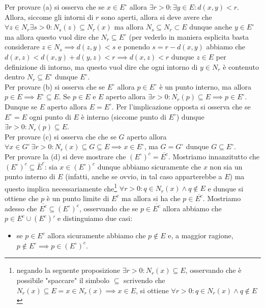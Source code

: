 \documentclass{report}
\begin{document}
\begin{mysolution}
Per provare (a) si osserva che se $x \in E^{\circ}$ allora $\exists r > 0: \exists y \in E: d(x, y) < r$. Allora, siccome gli intorni di $r$ sono aperti, allora si deve avere che $\forall z \in N_r \exists s > 0: N_s(z) \subseteq N_r(x)$ ma allora $N_s \subseteq N_r \subset E$ dunque anche $y \in E^{\circ}$ ma allora questo vuol dire che $N_r \subseteq E^{\circ}$ (per vederlo in maniera esplicita basta considerare $z \in N_s \implies d(z, y) < s$ e ponendo $s = r - d(x,y)$ abbiamo che $d(x, z) < d(x, y) + d(y, z) < r \implies d(x, z) < r$ dunque $z \in E$ per definizione di intorno, ma questo vuol dire che ogni intorno di $y \in N_r$ è contenuto dentro $N_r \subseteq E^{\circ}$ dunque $E^{\circ}$. \\
Per provare (b) si osserva che se $E^{\circ}$ allora $p \in E^{\circ}$ è un punto interno, ma allora $p \in E \implies E^{\circ} \subseteq E$. Se $p \in E$ e $E$ aperto allora $\exists r>0: N_r(p) \subseteq E \implies p \in E^{\circ}$. Dunque se $E$ aperto allora $E=E^{\circ}$. Per l'implicazione opposta si osserva che se $E^{\circ} = E$ ogni punto di $E$ è interno (siccome punto di $E^{\circ}$) dunque $\exists r>0: N_r(p) \subseteq E$. \\
Per provare (c) si osserva che che se $G$ aperto allora $\forall x \in G^{\circ} \, \exists r > 0: N_r(x) \subseteq G \subseteq E \implies x \in E^{\circ}$, ma $G=G^{\circ}$ dunque $G \subseteq E^{\circ}$. \\
Per provare la (d) si deve mostrare che $(E^{\circ})^c = \overline{E^c}$. Mostriamo innanzitutto che $(E^{\circ})^c \subseteq \bar{E}^c$: sia $x \in (E^{\circ})^c$ dunque abbiamo sicuramente che $x$ non sia un punto interno di $E$ (infatti, anche se ovvio, in tal caso apparterebbe a $E$) ma questo implica necessariamente che\footnote{negando la seguente proposizione $\exists r > 0: N_r(x) \subseteq E$, osservando che è possibile "spaccare" il simbolo $\subseteq$ scrivendo che $N_r(x) \subseteq E = x \in N_r(x) \implies x \in E$, si ottiene $\forall r > 0: q \in N_r(x) \wedge q \not\in E$} $\forall r > 0: q \in N_r(x) \wedge q \not\in E$ e dunque si ottiene che $p$ è un punto limite di $E^c$ ma allora si ha che $p \in \overline{E^c}$. Mostriamo adesso che $\overline{E^c} \subseteq (E^{\circ})^{c}$, osservando che se $p \in \overline{E^c}$ allora abbiamo che $p \in E^c \cup (E^c)'$ e distinguiamo due casi:
\begin{itemize}
	\item se $p \in E^c$ allora sicuramente abbiamo che $p \not\in E$ e, a maggior ragione, $p \not\in E^{\circ} \implies p \in (E^{\circ})^c$. 

\end{itemize}
\end{mysolution}
\end{document}
